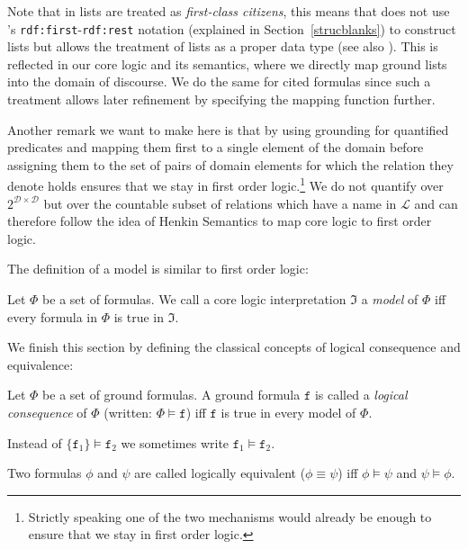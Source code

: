 Note that in \nthree lists are treated as \emph{first-class citizens}, this means that \nthree does not use \rdf's 
\texttt{rdf:first}-\texttt{rdf:rest} notation (explained in Section~\ref{strucblanks}) 
to construct lists but allows the treatment of lists as a proper data type (see also \cite[p.6]{N3Logic}).  
This is reflected
in our core logic and its semantics, where we directly map ground lists into the domain of discourse. We do the same for cited formulas since such a treatment allows later
refinement by specifying the mapping function further. %

Another remark we want to make here is that by using grounding for quantified predicates and mapping them first to a single element of the domain before assigning them
to the set of pairs of domain elements for which the relation they denote holds ensures  that we stay in first order 
logic.\footnote{Strictly speaking one of the two mechanisms would already be enough to ensure that we stay in first order logic.} 
We do not quantify over  $2^{\mathcal{D}\times\mathcal{D}}$ but over the countable subset of relations which have a name in $\mathcal{L}$ and can therefore follow the idea of  
Henkin Semantics \cite{henkin_1950} to map core logic to first order logic.
 

The definition of a model is similar to first order logic:


\begin{definition}[Model]
 Let $\Phi$ be a set of formulas. We call a core logic interpretation $\mathfrak{I}$ a \emph{model} of $\Phi$ iff every formula in $\Phi$ is true in $\mathfrak{I}$.
\end{definition}



We finish this section by defining the classical concepts of logical consequence and equivalence:

\begin{definition}
 Let $\Phi$ be a set of ground formulas. A ground formula $\texttt{f}$ is called a \emph{logical consequence} of $\Phi$ (written: $\Phi\models\texttt{f}$) 
 iff $\texttt{f}$ is true in every model 
 of $\Phi$.
\end{definition}
 Instead of $\{\texttt{f}_1\}\models \texttt{f}_2$ we sometimes write $\texttt{f}_1\models\texttt{f}_2$.

\begin{definition}
 Two formulas $\phi$ and $\psi$ are called logically equivalent ($\phi \equiv \psi$) iff $\phi \models \psi$ and $\psi\models \phi$.
\end{definition}


